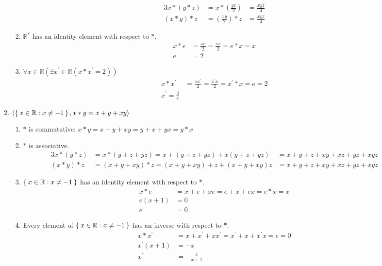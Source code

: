 \begin{enumerate}[label={\Alph*.},font={\bfseries}]
\begin{enumerate}[label={\arabic*},font={\bfseries}]
\begin{enumerate}[label={(\roman*)}]
      \begin{alignat*}{3}
        x*(y*z) &= x*(\frac{yz}{2}) &= \frac{xyz}{4} \\
        (x*y)*z &= (\frac{xy}{2})*z &= \frac{xyz}{4}
      \end{alignat*}
    \item $\mathbb{R}^*$ has an identity element with respect to $*$.
      \begin{align*}
        x*e &= \frac{xe}{2} = \frac{ex}{2}=e*x = x \\
        e &= 2
      \end{align*}
    \item $\forall x\in\mathbb{R}(\exists x^\prime\in\mathbb{R}(x*x^\prime=2))$
      \begin{align*}
        x*x^\prime &= \frac{xx^\prime}{2} = \frac{x^{\prime}x}{2} = x^{\prime}*x = e = 2 \\
        x^\prime = \frac{4}{x}
      \end{align*}
    \end{enumerate}
  \item $\langle\Set{x\in\mathbb{R} : x \neq -1}, x*y=x+y+xy\rangle$
    \begin{enumerate}[label={(\roman*)}]
    \item $*$ is commutative: $x*y=x+y+xy = y+x+yx=y*x$
    \item $*$ is associative.
      \begin{alignat*}{3}
        x*(y*z) &= x*(y+z+yz) = x+(y+z+yz)+x(y+z+yz) &= x+y+z+xy+xz+yz+xyz \\
        (x*y)*z &= (x+y+xy)*z = (x+y+xy)+z+(x+y+xy)z &= x+y+z+xy+xz+yz+xyz
      \end{alignat*}
    \item $\Set{x\in\mathbb{R} : x \neq -1}$ has an identity element with respect to $*$.
      \begin{align*}
        x*e &= x+e+xe = e+x+ex = e*x = x \\
        e(x+1) &= 0 \\
        e &= 0
      \end{align*}
    \item Every element of $\Set{x\in\mathbb{R} : x \neq -1}$ has an inverse with respect to $*$.
      \begin{align*}
        x*x^\prime &= x+x^\prime+xx^\prime=x^\prime+x+x^{\prime}x = e = 0 \\
        x^{\prime}(x+1) &= -x \\
        x^\prime &= -\frac{x}{x+1}
      \end{align*}

\end{enumerate}
\end{enumerate}
\end{enumerate}
